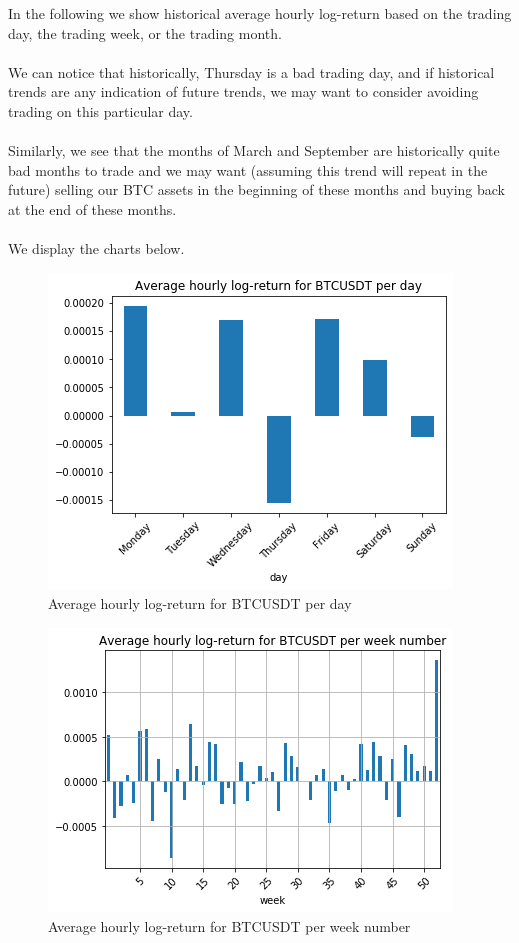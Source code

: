 \documentclass[twoside]{report}
\begin{document}
\begin{spacing}{1}
In the following we show historical average hourly log-return based on the trading day, the trading week, or the trading month.
\\ \\
We can notice that historically, Thursday is a bad trading day, and if historical trends are any indication of future trends, we may want to consider avoiding trading on this particular day.
\\ \\
Similarly, we see that the months of March and September are historically quite bad months to trade and we may want (assuming this trend will repeat in the future) selling our BTC assets in the beginning of these months and buying back at the end of these months.
\\ \\
We display the charts below.
\begin{figure}[!htbp]
    \centering
    \includegraphics[scale = 0.5]{Images/Average hourly log-return for BTCUSDT per day.png}
    \caption{Average hourly log-return for BTCUSDT per day}
    \label{Average hourly log-return for BTCUSDT per day}
\end{figure}

\begin{figure}[!htbp]
    \centering
    \includegraphics[scale = 0.5]{Images/Average hourly log-return for BTCUSDT per week number.png}
    \caption{Average hourly log-return for BTCUSDT per week number}
    \label{Average hourly log-return for BTCUSDT per week number}
\end{figure}


\end{spacing}
\end{document}
